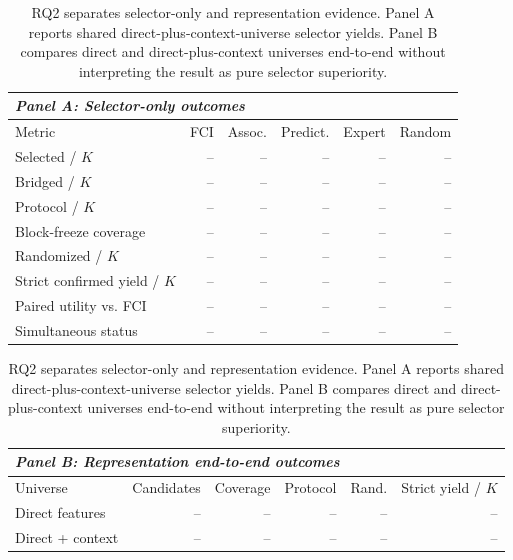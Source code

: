 \documentclass[acmsmall,screen,review,anonymous]{acmart}
\begin{document}
\begin{table}[H]
  \centering
  \small
  \caption{RQ2 separates selector-only and representation evidence. Panel A
  reports shared direct-plus-context-universe selector yields. Panel B compares
  direct and direct-plus-context universes end-to-end without interpreting the
  result as pure selector superiority.}
  \label{tab:rq2}
  \begin{tabular}{lrrrrr}
    \toprule
    \multicolumn{6}{l}{\textit{Panel A: Selector-only outcomes}} \\
    \midrule
    Metric & FCI & Assoc. & Predict. & Expert & Random \\
    \midrule
    Selected / $K$ & -- & -- & -- & -- & -- \\
    Bridged / $K$ & -- & -- & -- & -- & -- \\
    Protocol / $K$ & -- & -- & -- & -- & -- \\
    Block-freeze coverage & -- & -- & -- & -- & -- \\
    Randomized / $K$ & -- & -- & -- & -- & -- \\
    Strict confirmed yield / $K$ & -- & -- & -- & -- & -- \\
    Paired utility vs. FCI & -- & -- & -- & -- & -- \\
    Simultaneous status & -- & -- & -- & -- & -- \\
    \bottomrule
  \end{tabular}

  \medskip
  \begin{tabular}{lrrrrr}
    \toprule
    \multicolumn{6}{l}{\textit{Panel B: Representation end-to-end outcomes}} \\
    \midrule
    Universe & Candidates & Coverage & Protocol & Rand. & Strict yield / $K$ \\
    \midrule
    Direct features & -- & -- & -- & -- & -- \\
    Direct + context & -- & -- & -- & -- & -- \\
    \bottomrule
  \end{tabular}
\end{table}
\end{document}
